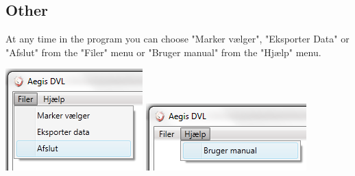 \documentclass[a4paper]{report}
\begin{document}
\subsection*{Other}
At any time in the program you can choose "Marker v\ae lger", "Eksporter Data" or "Afslut" from the "Filer" menu or "Bruger manual" from the "Hj\ae lp" menu. \\
\begin{center}
\includegraphics{FileMenu.png}
\includegraphics{HelpMenu.png}
\end{center}
\end{document}
